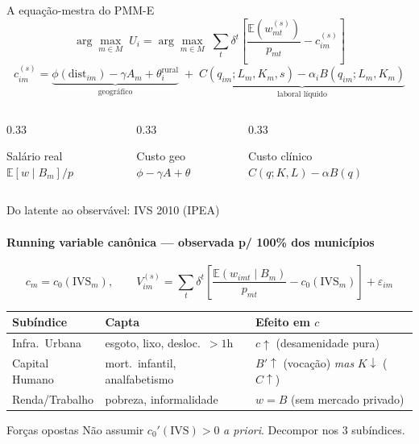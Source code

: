 \documentclass[10pt,aspectratio=169]{beamer}
\begin{document}
\begin{frame}{A equação-mestra do PMM-E}
\begin{equation*}
\arg\max_{m \in M}\; U_i
=
\arg\max_{m \in M}\;
\sum_t \delta^t
\left[
\frac{\mathbb{E}\!\left(w_{mt}^{(s)}\right)}{p_{mt}}
- c_{im}^{(s)}
\right]
\end{equation*}
\begin{equation*}
c_{im}^{(s)} =
\underbrace{\phi(\text{dist}_{im}) - \gamma A_m + \theta_i^{\text{rural}}}_{\text{geográfico}}
\;+\;
\underbrace{C(q_{im}; L_m, K_m, s) - \alpha_i B(q_{im}; L_m, K_m)}_{\text{laboral líquido}}
\end{equation*}
\begin{columns}[T]
\begin{column}{0.33\textwidth}
\begin{block}{Salário real}$\mathbb{E}[w \mid B_m]/p$\end{block}
\end{column}
\begin{column}{0.33\textwidth}
\begin{block}{Custo geo}$\phi - \gamma A + \theta$\end{block}
\end{column}
\begin{column}{0.33\textwidth}
\begin{block}{Custo clínico}$C(q;K,L) - \alpha B(q)$\end{block}
\end{column}
\end{columns}
\end{frame}

\begin{frame}{Do latente ao observável: IVS 2010 (IPEA)}
\framesubtitle{Running variable canônica — observada p/ 100\% dos municípios}
\begin{equation*}
c_m = c_0(\text{IVS}_m),
\qquad
V_{im}^{(s)} = \sum_t \delta^t \left[ \frac{\mathbb{E}(w_{imt} \mid B_m)}{p_{mt}} - c_0(\text{IVS}_m) \right] + \varepsilon_{im}
\end{equation*}
\begin{tabular}{lll}
\toprule
Subíndice & Capta & Efeito em $c$ \\
\midrule
Infra.\ Urbana & esgoto, lixo, desloc.\ $>1$h & $c \uparrow$ (desamenidade pura) \\
Capital Humano & mort.\ infantil, analfabetismo & $B' \uparrow$ (vocação) \emph{mas} $K \downarrow$ ($C \uparrow$) \\
Renda/Trabalho & pobreza, informalidade & $w = B$ (sem mercado privado) \\
\bottomrule
\end{tabular}
\begin{alertblock}{Forças opostas}
Não assumir $c_0'(\text{IVS}) > 0$ \emph{a priori}. Decompor nos 3 subíndices.
\end{alertblock}
\end{frame}
\end{document}
